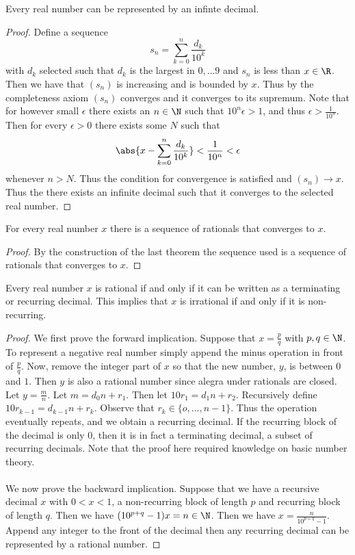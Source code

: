 \begin{thm}{}{} Every real number can be represented by an infinte decimal. \tcbline
\begin{proof} Define a sequence $$s_n=\sum_{k=0}^{n}\frac{d_k}{10^k}$$ with $d_k$ selected such that $d_k$ is the largest in ${0,\dots 9}$ and $s_n$ is less than $x\in\R$. Then we have that $(s_n)$ is increasing and is bounded by $x$. Thus by the completeness axiom $(s_n)$ converges and it converges to its supremum. Note that for however small $\epsilon$ there exists an $n\in\N$ such that $10^n\epsilon>1$, and thus $\epsilon>\frac{1}{10^n}$. Then for every $\epsilon>0$ there exists some $N$ such that $$\abs{x-\sum_{k=0}^{n}\frac{d_k}{10^k}}<\frac{1}{10^n}<\epsilon$$ whenever $n>N$. Thus the condition for convergence is satisfied and $(s_n)\to x$. Thus the there exists an infinite decimal such that it converges to the selected real number. 
\end{proof}
\end{thm}

\begin{lmm}{}{} For every real number $x$ there is a sequence of rationals that converges to $x$. \tcbline
\begin{proof} By the construction of the last theorem the sequence used is a sequence of rationals that converges to $x$. 
\end{proof}
\end{lmm} 

\begin{thm}{}{} Every real number $x$ is rational if and only if it can be written as a terminating or recurring decimal. This implies that $x$ is irrational if and only if it is non-recurring. \tcbline
\begin{proof} We first prove the forward implication. Suppose that $x=\frac{p}{q}$ with $p,q\in\N$. To represent a negative real number simply append the minus operation in front of $\frac{p}{q}$. Now, remove the integer part of $x$ so that the new number, $y$, is between $0$ and $1$. Then $y$ is also a rational number since alegra under rationals are closed. Let $y=\frac{m}{n}$. Let $m=d_0n+r_1$. Then let $10r_1=d_1n+r_2$. Recursively define $10r_{k-1}=d_{k-1}n+r_k$. Observe that $r_k\in\{o,\dots,n-1\}$. Thus the operation eventually repeats, and we obtain a recurring decimal. If the recurring block of the decimal is only $0$, then it is in fact a terminating decimal, a subset of recurring decimals. Note that the proof here required knowledge on basic number theory. \\~\\
We now prove the backward implication. Suppose that we have a recursive decimal $x$ with $0<x<1$, a non-recurring block of length $p$ and recurring block of length $q$. Then we have $(10^{p+q}-1)x=n\in\N$. Then we have $x=\frac{n}{10^{p+q}-1}$. Append any integer to the front of the decimal then any recurring decimal can be represented by a rational number. 
\end{proof}
\end{thm}

